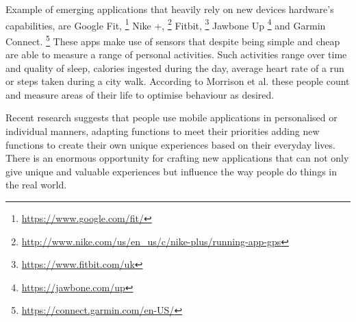 Example of emerging applications that heavily rely on new devices hardware's capabilities, are Google Fit, \footnote{\url{https://www.google.com/fit/}} Nike +, \footnote{\url{http://www.nike.com/us/en_us/c/nike-plus/running-app-gps}} Fitbit, \footnote{\url{https://www.fitbit.com/uk}} Jawbone Up \footnote{\url{https://jawbone.com/up}} and Garmin Connect. \footnote{\url{https://connect.garmin.com/en-US/}} These apps make use of sensors that despite being simple and cheap are able to measure a range of personal activities. Such activities range over time and quality of sleep, calories ingested during the day, average heart rate of a run or steps taken during a city walk. According to Morrison et al. \cite{Rooksby2014} these people count and measure areas of their life to optimise behaviour as desired.

Recent research \cite{Barkhuus2011} suggests that people use mobile applications in personalised or individual manners, adapting functions to meet their priorities adding new functions to create their own unique experiences based on their everyday lives. There is an enormous opportunity for crafting new applications that can not only  give unique and valuable experiences but influence the way people do things in the real world. 


